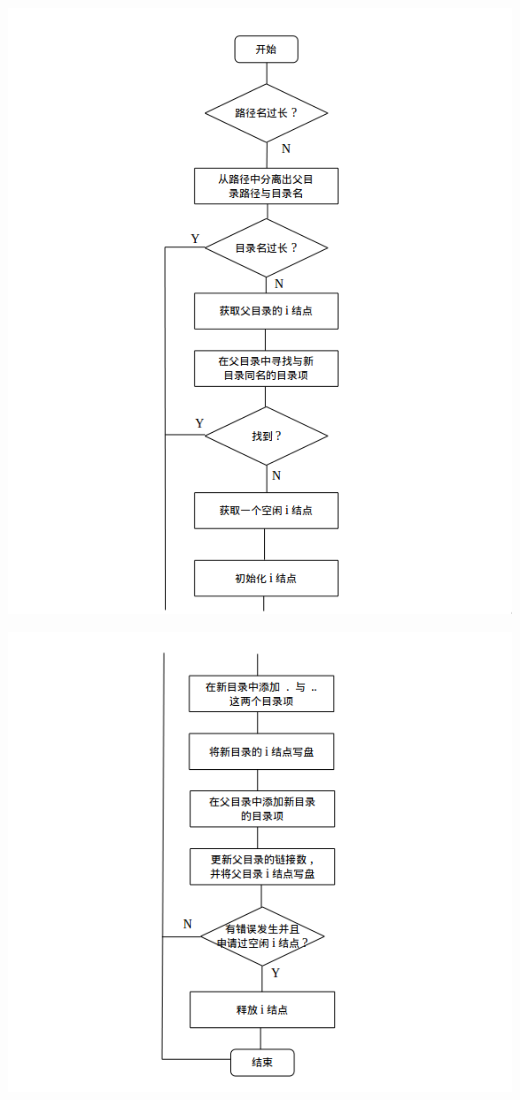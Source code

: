 \documentclass[nofonts, titlepage]{ctexart}
\begin{document}
\begin{itemize}
  \includegraphics[width=15cm]{./images/./mkdir_1.png}

  \includegraphics[width=15cm]{./images/./mkdir_2.png}
  \end{itemize}
\end{document}

